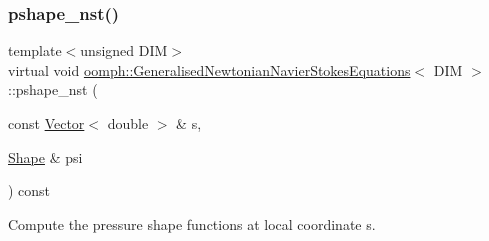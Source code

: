 \mbox{\label{classoomph_1_1GeneralisedNewtonianNavierStokesEquations_a84735d21f3d1ade819726a71a7b462e1}} 
\subsubsection{\texorpdfstring{pshape\+\_\+nst()}{pshape\_nst()}\hspace{0.1cm}{\footnotesize\ttfamily [1/2]}}
{\footnotesize\ttfamily template$<$unsigned D\+IM$>$ \\
virtual void \hyperlink{classoomph_1_1GeneralisedNewtonianNavierStokesEquations}{oomph\+::\+Generalised\+Newtonian\+Navier\+Stokes\+Equations}$<$ D\+IM $>$\+::pshape\+\_\+nst (\begin{DoxyParamCaption}\item[{const \hyperlink{classoomph_1_1Vector}{Vector}$<$ double $>$ \&}]{s,  }\item[{\hyperlink{classoomph_1_1Shape}{Shape} \&}]{psi }\end{DoxyParamCaption}) const\hspace{0.3cm}{\ttfamily [pure virtual]}}



Compute the pressure shape functions at local coordinate s. 



